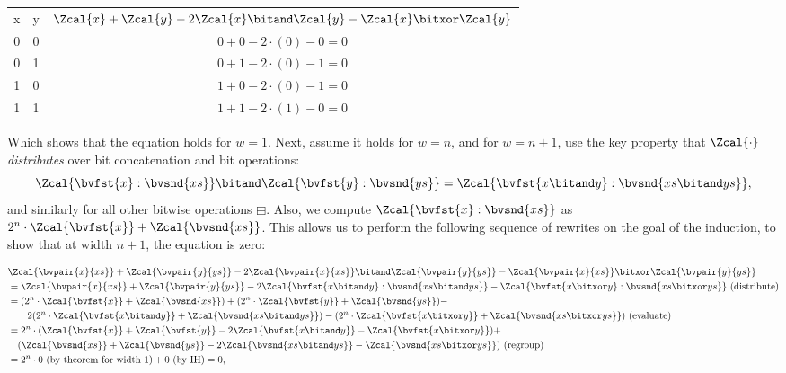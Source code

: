 \begin{tabular}{ccc}
\rowcolor{gray!10}
  x & y & $\Zcal{x} + \Zcal{y} - 2 \Zcal{x} \bitand \Zcal{y} - \Zcal{x} \bitxor \Zcal{y}$ \\
  0 & 0 & $0 + 0 - 2 \cdot (0) - 0 = 0$ \\
\rowcolor{gray!10}
  0 & 1 & $0 + 1 - 2 \cdot (0) - 1 = 0$ \\
  1 & 0 & $1 + 0 - 2 \cdot (0) - 1 = 0$ \\
\rowcolor{gray!10}
  1 & 1 & $1 + 1 - 2 \cdot (1) - 0 = 0$
\end{tabular}

Which shows that the equation holds for $w = 1$.
Next, assume it holds for $w = n$, and for $w = n + 1$,
use the key property that $\Zcal{\cdot}$ \emph{distributes} over bit concatenation and bit operations:
$$\Zcal{\bvfst{x} : \bvsnd{xs}} \bitand \Zcal{\bvfst{y} : \bvsnd{ys}} = \Zcal{\bvfst{x \bitand y} : \bvsnd{xs \bitand ys}},$$
and similarly for all other bitwise operations $\boxplus$.
Also, we compute $\Zcal{\bvfst{x} : \bvsnd{xs}}$ as $2^n \cdot \Zcal{\bvfst{x}} + \Zcal{\bvsnd{xs}}$.
This allows us to perform the following sequence of rewrites on the goal of the induction, to show
that at width $n + 1$, the equation is zero:

{\footnotesize
\begin{align*}
  &\Zcal{\bvpair{x}{xs}} + \Zcal{\bvpair{y}{ys}} - 2 \Zcal{\bvpair{x}{xs}} \bitand \Zcal{\bvpair{y}{ys}} - \Zcal{\bvpair{x}{xs}} \bitxor \Zcal{\bvpair{y}{ys}} \\
  &= \Zcal{\bvpair{x}{xs}} + \Zcal{\bvpair{y}{ys}} - 2 \Zcal{\bvfst{x \bitand y} : \bvsnd{xs \bitand ys}} - \Zcal {\bvfst{x \bitxor y} : \bvsnd{xs \bitxor ys}}~ (\text{distribute})\\
  &= (2^n \cdot \Zcal{\bvfst{x}} + \Zcal{\bvsnd{xs}}) + (2^n \cdot \Zcal{\bvfst{y}} + \Zcal{\bvsnd{ys}}) - \\
  & \qquad 2 (2^n \cdot \Zcal{\bvfst{x \bitand y}} + \Zcal{\bvsnd{xs \bitand ys}}) - (2^n \cdot \Zcal{\bvfst{x \bitxor y}} + \Zcal{\bvsnd{xs \bitxor ys}})~(\text{evaluate})\\
  &= 2^n \cdot (\Zcal{\bvfst{x}} + \Zcal{\bvfst{y}} - 2 \Zcal{\bvfst{x \bitand y}} - \Zcal{\bvfst{x \bitxor y}}) + \\
  & \quad (\Zcal{\bvsnd{xs}} + \Zcal{\bvsnd{ys}} - 2 \Zcal{\bvsnd{xs \bitand ys}} - \Zcal{\bvsnd{xs \bitxor ys}})~(\text{regroup}) \\
  &= 2^n \cdot 0~(\text{by theorem for width 1}) + 0~(\text{by IH}) = 0,
\end{align*}
}

